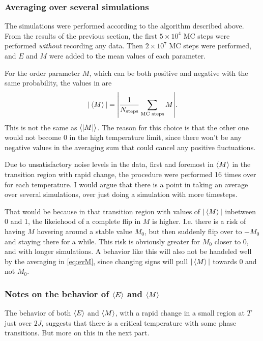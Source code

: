 \documentclass[11pt,letter, swedish, english
]{article}
\begin{document}
\subsubsection{Averaging over several simulations}
\label{sec:sim_avg}
The simulations were performed according to the algorithm described
above. From the results of the previous section, the first
$5\times10^4$ MC steps were performed \emph{without} recording any
data. Then $2\times10^7$ MC steps were performed, and $E$ and $M$ were
added to the mean values of each parameter.

For the order parameter $M$, which can be both positive and negative with
the same probability, the values in  are
\begin{equation}\label{eq:evM}
|\ev{M}| = \abs{\frac{1}{N_\text{steps}} \sum_{\text{MC steps}} M}.
\end{equation}
This is not the same as $\ev{|M|}$. The reason for this choice is that
the other one would not become $0$ in the high temperature limit,
since there won't be any negative values in the averaging sum that
could cancel any positive fluctuations. 

Due to unsatisfactory noise levels in the data, first and foremost in
$\ev{M}$ in the transition region with rapid change, the procedure
were performed 16 times over for each temperature. I would argue that
there is a point in taking an average over several simulations, over
just doing a simulation with more timesteps. 

That would be because in that transition region with values of
$|\ev{M}|$ inbetween 0 and 1, the likeiehood of a complete flip in $M$
is higher. I.e. there is a risk of having $M$ hovering around a stable
value $M_0$, but then suddenly flip over to $-M_0$ and staying there
for a while. This risk is obviously greater for $M_0$ closer to $0$,
and with longer simulations. 
A behavior like this will also not be handeled well by the averaging
in \eqref{eq:evM}, since changing signs will pull $|\ev{M}|$ towards 0
and not $M_0$. 


\subsubsection{Notes on the behavior of $\ev{E}$ and $\ev{M}$}
The behavior of both $\ev{E}$ and $\ev{M}$, with a rapid change in a
small region at $T$ just over $2J$, suggests that there is a critical
temperature with some phase transitions. But more on this in the next
part. 
\end{document}
